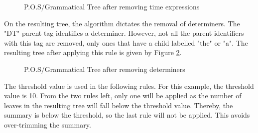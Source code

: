 \begin{figure}[H]
\caption{P.O.S/Grammatical Tree after removing time expressions}
\label{tree:removeTime}
\end{figure}
\par On the resulting tree, the algorithm dictates the removal of determiners. The "DT" parent tag identifies a determiner. However, not all the parent identifiers with this tag are removed, only ones that have a child labelled "the" or "a". The resulting tree after applying this rule is given by Figure \ref{tree:removeDeterminers}.
\begin{figure}[H]
\caption{P.O.S/Grammatical Tree after removing determiners}
\label{tree:removeDeterminers}
\end{figure}
\par The threshold value is used in the following rules. For this example, the threshold value is 10. From the two rules left, only one will be applied as the number of leaves in the resulting tree will fall below the threshold value. Thereby, the summary is below the threshold, so the last rule will not be applied. This avoids over-trimming the summary.
